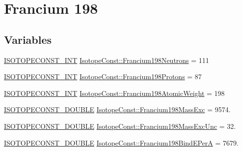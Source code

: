 \hypertarget{group___isotope_const-_francium-_fr198}{}\section{Francium 198}
\label{group___isotope_const-_francium-_fr198}
\subsection*{Variables}
\begin{DoxyCompactItemize}
\item 
\mbox{\hyperlink{group___isotope_const-_macros_ga5f18360b3e99483a35c32d789e62621c}{I\+S\+O\+T\+O\+P\+E\+C\+O\+N\+S\+T\+\_\+\+I\+NT}} \mbox{\hyperlink{group___isotope_const-_francium-_fr198_ga4ed4c53e73a785b355523b78c98170cb}{Isotope\+Const\+::\+Francium198\+Neutrons}} = 111
\item 
\mbox{\hyperlink{group___isotope_const-_macros_ga5f18360b3e99483a35c32d789e62621c}{I\+S\+O\+T\+O\+P\+E\+C\+O\+N\+S\+T\+\_\+\+I\+NT}} \mbox{\hyperlink{group___isotope_const-_francium-_fr198_ga0201a63358c28802b8e924370b2a8ca1}{Isotope\+Const\+::\+Francium198\+Protons}} = 87
\item 
\mbox{\hyperlink{group___isotope_const-_macros_ga5f18360b3e99483a35c32d789e62621c}{I\+S\+O\+T\+O\+P\+E\+C\+O\+N\+S\+T\+\_\+\+I\+NT}} \mbox{\hyperlink{group___isotope_const-_francium-_fr198_gac91eca88cec33bb61c9d9087a5180e49}{Isotope\+Const\+::\+Francium198\+Atomic\+Weight}} = 198
\item 
\mbox{\hyperlink{group___isotope_const-_macros_ga8f45a7272ce02c0b4c65c44636ed719a}{I\+S\+O\+T\+O\+P\+E\+C\+O\+N\+S\+T\+\_\+\+D\+O\+U\+B\+LE}} \mbox{\hyperlink{group___isotope_const-_francium-_fr198_ga17cb888454bdb395291b216748afac25}{Isotope\+Const\+::\+Francium198\+Mass\+Exc}} = 9574.
\item 
\mbox{\hyperlink{group___isotope_const-_macros_ga8f45a7272ce02c0b4c65c44636ed719a}{I\+S\+O\+T\+O\+P\+E\+C\+O\+N\+S\+T\+\_\+\+D\+O\+U\+B\+LE}} \mbox{\hyperlink{group___isotope_const-_francium-_fr198_gaac1f68acb5e9ce4016ad9bd6fd346fad}{Isotope\+Const\+::\+Francium198\+Mass\+Exc\+Unc}} = 32.
\item 
\mbox{\hyperlink{group___isotope_const-_macros_ga8f45a7272ce02c0b4c65c44636ed719a}{I\+S\+O\+T\+O\+P\+E\+C\+O\+N\+S\+T\+\_\+\+D\+O\+U\+B\+LE}} \mbox{\hyperlink{group___isotope_const-_francium-_fr198_gaa2a0222ba02bfbbd5cb336adf3e970c5}{Isotope\+Const\+::\+Francium198\+Bind\+E\+PerA}} = 7679.
\item 

\end{DoxyCompactItemize}
